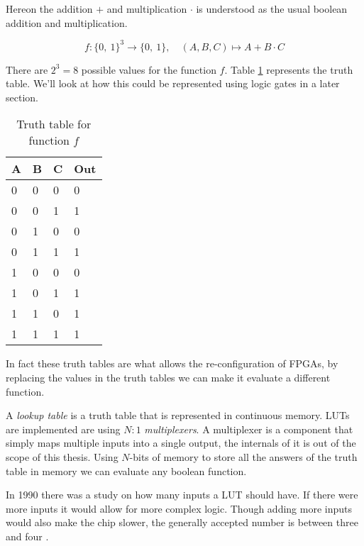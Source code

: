 \begin{example}
    \label{ex:boolean_function}

    Hereon the addition $+$ and multiplication $\cdot$ is understood as the
    usual boolean addition and multiplication.

    \begin{equation} \label{eq:examle_eq}
    f \colon \{0,\ 1\}^3 \rightarrow \{0,\ 1\}, \quad (A, B, C) \mapsto A + B \cdot C
    \end{equation}

    There are $2^3 = 8$ possible values for the function $f$. Table
    \ref{tab:example_truth_table} represents the truth table. We'll look at how
    this could be represented using logic gates in a later section.
    \begin{table}[H]
        \centering
        \begin{tabular}{|l|l|l|l|}
            \hline
            A & B & C & Out \\ \hline
            0 & 0 & 0 & 0   \\ \hline
            0 & 0 & 1 & 1   \\ \hline
            0 & 1 & 0 & 0   \\ \hline
            0 & 1 & 1 & 1   \\ \hline
            1 & 0 & 0 & 0   \\ \hline
            1 & 0 & 1 & 1   \\ \hline
            1 & 1 & 0 & 1   \\ \hline
            1 & 1 & 1 & 1   \\ \hline
        \end{tabular}
        \caption{Truth table for function $f$}
        \label{tab:example_truth_table}
    \end{table}


    In fact these truth tables are what allows the re-configuration of FPGAs, by
    replacing the values in the truth tables we can make it evaluate a different
    function.
\end{example}

\begin{definition}

    A \textit{lookup table} is a truth table that is represented in continuous
    memory. LUTs are implemented are using $N:1$ \textit{multiplexers}. A
    multiplexer is a component that simply maps multiple inputs into a single
    output, the internals of it is out of the scope of this thesis. Using $N$-bits
    of memory to store all the answers of the truth table in memory we can evaluate
    any boolean function.

    In 1990 there was a study on how many inputs a LUT should have. If
    there were more inputs it would allow for more complex logic. Though adding more
    inputs would also make the chip slower, the generally accepted number is
    between three and four \citep{RoseArchitecture}.

\end{definition}

